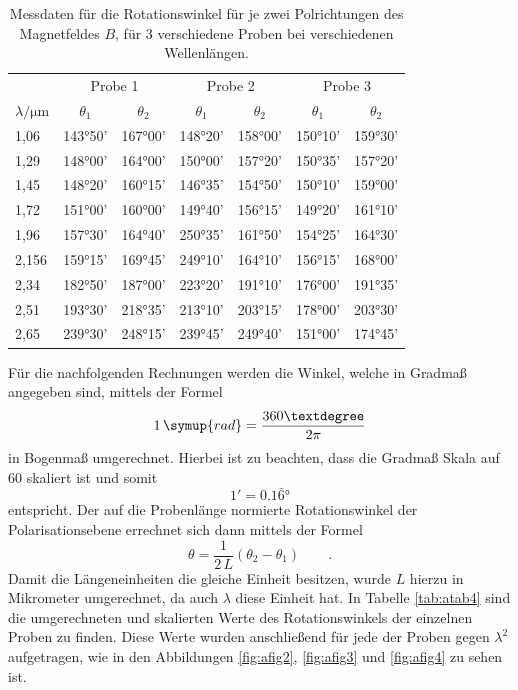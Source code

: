 \FloatBarrier
\begin{table}[h]
    \centering
    \caption{Messdaten für die Rotationswinkel für je zwei Polrichtungen des Magnetfeldes $B$, für 3 verschiedene Proben bei verschiedenen Wellenlängen.}
    \label{tab:atab3}
    \begin{tabular}{l c c c c c c}
        \toprule
        & \multicolumn{2}{c}{Probe 1} & \multicolumn{2}{c}{Probe 2} & \multicolumn{2}{c}{Probe 3} \\
        \cmidrule(lr){2-3}\cmidrule(lr){4-5}\cmidrule(lr){6-7}
        {$\lambda / \si{\micro\meter}$} & {$\theta_1$} & {$\theta_2$} & {$\theta_1$} & {$\theta_2$} & {$\theta_1$} & {$\theta_2$} \\
        \midrule

        1,06 & 143°50' & 167°00' & 148°20' & 158°00' & 150°10' & 159°30' \\
        1,29 & 148°00' & 164°00' & 150°00' & 157°20' & 150°35' & 157°20' \\
        1,45 & 148°20' & 160°15' & 146°35' & 154°50' & 150°10' & 159°00' \\
        1,72 & 151°00' & 160°00' & 149°40' & 156°15' & 149°20' & 161°10' \\
        1,96 & 157°30' & 164°40' & 250°35' & 161°50' & 154°25' & 164°30' \\
        2,156& 159°15' & 169°45' & 249°10' & 164°10' & 156°15' & 168°00' \\
        2,34 & 182°50' & 187°00' & 223°20' & 191°10' & 176°00' & 191°35' \\
        2,51 & 193°30' & 218°35' & 213°10' & 203°15' & 178°00' & 203°30' \\
        2,65 & 239°30' & 248°15' & 239°45' & 249°40' & 151°00' & 174°45' \\

        \bottomrule
    \end{tabular}
\end{table}
\FloatBarrier
\noindent

Für die nachfolgenden Rechnungen werden die Winkel, welche in Gradmaß angegeben sind, mittels der Formel
\begin{equation}
    1\, \symup{rad} = \frac{360°}{2\pi}
\end{equation}
in Bogenmaß umgerechnet. Hierbei ist zu beachten, dass die Gradmaß Skala auf $60$ skaliert ist und somit
\begin{equation*}
    1' = 0.1\bar{6}°
\end{equation*}
entspricht. Der auf die Probenlänge normierte Rotationswinkel der Polarisationsebene errechnet sich dann mittels der Formel
\begin{equation}
    \theta = \frac{1}{2\, L}(\theta_2 - \theta_1) \qquad .
\end{equation}
Damit die Längeneinheiten die gleiche Einheit besitzen, wurde $L$ hierzu in Mikrometer umgerechnet, da auch $\lambda$ diese Einheit hat.
In Tabelle \ref{tab:atab4} sind die umgerechneten und skalierten Werte des Rotationswinkels der einzelnen Proben zu finden. Diese Werte wurden anschließend für jede der Proben gegen $\lambda^2$ 
aufgetragen, wie in den Abbildungen \ref{fig:afig2}, \ref{fig:afig3} und \ref{fig:afig4} zu sehen ist.

